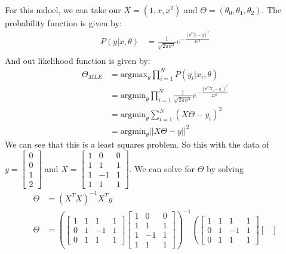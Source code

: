 \documentclass[answers,12pt,addpoints]{exam}
\begin{document}
\begin{questions}
\begin{solution}
For this mdoel, we can take our $X = (1, x, x^2)$ and $\Theta = (\theta_0, \theta_1, \theta_2)$. The probability function is given by:
\begin{align*}
    P(y|x, \theta) &= \frac{1}{\sqrt{2\pi \sigma^2}} e^{-\frac{(\theta^T X-y)^2}{2\sigma^2}} \\
\end{align*}
And out likelihood function is given by:
\begin{align*}
    \Theta_{MLE} &= \text{argmax}_{\theta} \prod_{i=1}^N P(y_i|x_i, \theta) \\
    &= \text{argmin}_{\theta} \prod_{i=1}^N \frac{1}{\sqrt{2\pi \sigma^2}} e^{-\frac{(\theta^T X_i-y_i)^2}{2\sigma^2}} \\
    &= \text{argmin}_{\theta} \sum_{i=1}^N (X\Theta - y_i)^2 \\
    &= \text{argmin}_{\theta} ||X\Theta - y||^2 
\end{align*}
We can see that this is a least squares problem. So this with the data of $y = \begin{bmatrix}
0 \\ 0 \\ 1 \\ 2
\end{bmatrix}$ and $X = \begin{bmatrix}
1 & 0 & 0 \\
1 & 1 & 1 \\
1 & -1 & 1 \\
1 & 1 & 1
\end{bmatrix}$. We can solve for $\Theta$ by solving
\begin{align*}
    \Theta &= (X^TX)^{-1}X^Ty \\
    \Theta &= \left( \begin{bmatrix}
    1 & 1 & 1 & 1 \\
    0 & 1 & -1 & 1 \\
    0 & 1 & 1 & 1
    \end{bmatrix} \begin{bmatrix}
    1 & 0 & 0 \\
    1 & 1 & 1 \\
    1 & -1 & 1 \\
    1 & 1 & 1
    \end{bmatrix}\right)^{-1} \left( \begin{bmatrix}
    1 & 1 & 1 & 1 \\
    0 & 1 & -1 & 1 \\
    0 & 1 & 1 & 1
    \end{bmatrix} \begin{bmatrix}

\end{bmatrix}
\end{align*}
\end{solution}
\end{questions}
\end{document}
